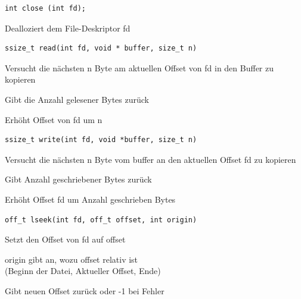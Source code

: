 \begin{multicols*}{5}
		\vspace{-6pt}
		\begin{lstlisting}
int close (int fd);
		\end{lstlisting}
		\vspace{-6pt}
		\begin{compactitem}[$\bullet$]
			\item Dealloziert dem File-Deskriptor fd
		\end{compactitem}
			
		\vspace{-6pt}
		\begin{lstlisting}
ssize_t read(int fd, void * buffer, size_t n)
		\end{lstlisting}
		\vspace{-6pt}
		\begin{compactitem}[$\bullet$]
			\item Versucht die nächsten n Byte am aktuellen Offset von fd in den Buffer zu kopieren
			\item Gibt die Anzahl gelesener Bytes zurück	
			\item Erhöht Offset von fd um n
		\end{compactitem}

		\vspace{-6pt}
		\begin{lstlisting}
ssize_t write(int fd, void *buffer, size_t n)
		\end{lstlisting}
		\vspace{-6pt}
		\begin{compactitem}[$\bullet$]
			\item Versucht die nächsten n Byte vom buffer an den aktuellen Offset fd zu kopieren
			\item Gibt Anzahl geschriebener Bytes zurück
			\item Erhöht Offset fd um Anzahl geschrieben Bytes
		\end{compactitem}
			
		\vspace{-6pt}
		\begin{lstlisting}
off_t lseek(int fd, off_t offset, int origin)
		\end{lstlisting}
		\vspace{-6pt}
		\begin{compactitem}[$\bullet$]
			\item Setzt den Offset von fd auf offset
			\item origin gibt an, wozu offset relativ ist\\
			(Beginn der Datei, Aktueller Offset, Ende)
			\item Gibt neuen Offset zurück oder -1 bei Fehler
		\end{compactitem}
			

\end{multicols*}
